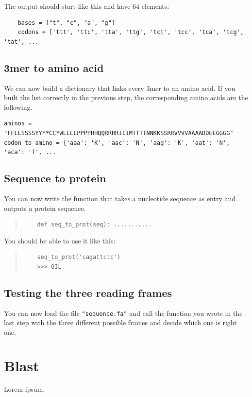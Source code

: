 \documentclass[a4paper,11pt]{article}
\begin{document}
The output should start like this and have 64 elements:

\begin{verbatim}
    bases = ["t", "c", "a", "g"]
	codons = ['ttt', 'ttc', 'tta', 'ttg', 'tct', 'tcc', 'tca', 'tcg', 'tat', ...
\end{verbatim}

\subsection{3mer to amino acid}
We can now build a dictionary that links every 3mer to an amino acid. If you built the list correctly in the previous step, the corresponding amino acids are the following.

\begin{verbatim}
aminos = "FFLLSSSSYY**CC*WLLLLPPPPHHQQRRRRIIIMTTTTNNKKSSRRVVVVAAAADDEEGGGG"
codon_to_amino = {'aaa': 'K', 'aac': 'N', 'aag': 'K', 'aat': 'N', 'aca': 'T', ...
\end{verbatim}

\subsection{Sequence to protein}
You can now write the function that takes a nucleotide sequence as entry and outputs a protein sequence.

\begin{quote}
\begin{verbatim}
	def seq_to_prot(seq): ...........
\end{verbatim}
\end{quote}

You should be able to use it like this:
\begin{quote}
\begin{verbatim}
	seq_to_prot('cagattctc')
	>>> QIL
\end{verbatim}
\end{quote}

\subsection{Testing the three reading frames}
You can now load the file \texttt{"sequence.fa"} and call the function you wrote in the last step with the three different possible frames and decide which one is right one.

\section{Blast}
Lorem ipsum.
\end{document}
